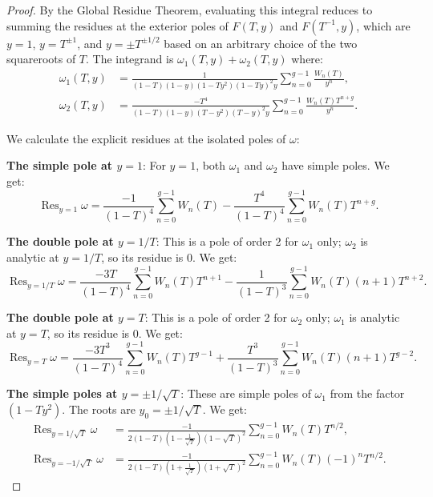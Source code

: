 \documentclass[11pt]{amsart}
\theoremstyle{definition}
\begin{document}
\begin{proof}
By the Global Residue Theorem, evaluating this integral reduces to summing the residues at the exterior poles of $F(T,y)$ and $F(T^{-1},y)$, which are $y=1$, $y=T^{\pm 1}$, and $y=\pm T^{\pm 1/2}$ based on an arbitrary choice of the two squareroots of $T$.
 The integrand is $\omega_1(T,y) + \omega_2(T,y)$ where:
\begin{align*}
\omega_1(T,y) &= \frac{1}{(1-T)(1-y)(1-Ty^2)(1-Ty)^2 y} \sum_{n=0}^{g-1} \frac{W_n(T)}{y^n}, \\
\omega_2(T,y) &= \frac{-T^4}{(1-T)(1-y)(T-y^2)(T-y)^2 y} \sum_{n=0}^{g-1} \frac{W_n(T) T^{n+g}}{y^n}.
\end{align*}

We calculate the explicit residues at the isolated poles of $\omega$:


\textbf{ The simple pole at $y=1$}:
For $y=1$, both $\omega_1$ and $\omega_2$ have simple poles. We get: 
\begin{equation*}
\operatorname{Res}_{y=1} \omega = \frac{-1}{(1-T)^4} \sum_{n=0}^{g-1} W_n(T) -\frac{T^4}{(1-T)^4} \sum_{n=0}^{g-1} W_n(T) T^{n+g}.
\end{equation*}

\textbf{ The double pole at $y=1/T$}:
This is a pole of order 2 for $\omega_1$ only; $\omega_2$ is analytic at $y=1/T$, so its residue is $0$. We get:
\begin{equation*}
\operatorname{Res}_{y=1/T} \omega = \frac{-3T}{(1-T)^4} \sum_{n=0}^{g-1} W_n(T) T^{n+1} - \frac{1}{(1-T)^3} \sum_{n=0}^{g-1} W_n(T) (n+1) T^{n+2}.
\end{equation*}

\textbf{ The double pole at $y=T$}:
This is a pole of order 2 for $\omega_2$ only; $\omega_1$ is analytic at $y=T$, so its residue is $0$. We get:
\begin{equation*}
\operatorname{Res}_{y=T} \omega = \frac{-3T^3}{(1-T)^4} \sum_{n=0}^{g-1} W_n(T) T^{g-1} + \frac{T^3}{(1-T)^3} \sum_{n=0}^{g-1} W_n(T) (n+1) T^{g-2}.
\end{equation*}

\textbf{ The simple poles at $y = \pm 1/\sqrt{T}$}:
These are simple poles of $\omega_1$ from the factor $(1-Ty^2)$. The roots are $y_0 = \pm 1/\sqrt{T}$. We get:
\begin{align*}
\operatorname{Res}_{y=1/\sqrt{T}} \omega &= \frac{-1}{2(1-T)\left(1-\frac{1}{\sqrt{T}}\right)(1-\sqrt{T})^2} \sum_{n=0}^{g-1} W_n(T) T^{n/2}, \\
\operatorname{Res}_{y=-1/\sqrt{T}} \omega &= \frac{-1}{2(1-T)\left(1+\frac{1}{\sqrt{T}}\right)(1+\sqrt{T})^2} \sum_{n=0}^{g-1} W_n(T) (-1)^n T^{n/2}.
\end{align*}


\end{proof}
\end{document}
